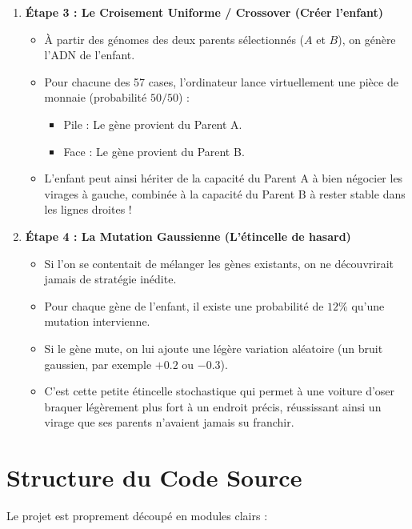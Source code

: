 \documentclass[12pt,a4paper]{article}
\begin{document}
\begin{enumerate}[leftmargin=*]
  \item \textbf{Étape 3 : Le Croisement Uniforme / Crossover (Créer l'enfant)}
  \begin{itemize}
    \item À partir des génomes des deux parents sélectionnés ($A$ et $B$), on génère l'ADN de l'enfant.
    \item Pour chacune des 57 cases, l'ordinateur lance virtuellement une pièce de monnaie (probabilité $50/50$) :
    \begin{itemize}
      \item Pile : Le gène provient du Parent A.
      \item Face : Le gène provient du Parent B.
    \end{itemize}
    \item L'enfant peut ainsi hériter de la capacité du Parent A à bien négocier les virages à gauche, combinée à la capacité du Parent B à rester stable dans les lignes droites !
  \end{itemize}

  \item \textbf{Étape 4 : La Mutation Gaussienne (L'étincelle de hasard)}
  \begin{itemize}
    \item Si l'on se contentait de mélanger les gènes existants, on ne découvrirait jamais de stratégie inédite.
    \item Pour chaque gène de l'enfant, il existe une probabilité de $12\%$ qu'une mutation intervienne.
    \item Si le gène mute, on lui ajoute une légère variation aléatoire (un bruit gaussien, par exemple $+0.2$ ou $-0.3$).
    \item C'est cette petite étincelle stochastique qui permet à une voiture d'oser braquer légèrement plus fort à un endroit précis, réussissant ainsi un virage que ses parents n'avaient jamais su franchir.
  \end{itemize}
\end{enumerate}

\section{Structure du Code Source}

Le projet est proprement découpé en modules clairs :
\end{document}

